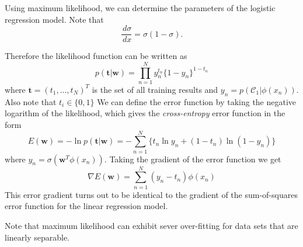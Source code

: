 \documentclass[11pt]{article}
\begin{document}
  Using maximum likelihood, we can determine the parameters of the logistic
  regression model. Note that
  \begin{equation*}
    \frac{\,d\sigma}{\,dx} = \sigma(1-\sigma).
  \end{equation*}

  Therefore the likelihood function can be written as
  \begin{equation*}
    p(\textbf{t}|\textbf{w}) = \prod_{n=1}^N y_n^{t_n} \{1-y_n\}^{1-t_n}
  \end{equation*}
  where $\textbf{t} = (t_1, ..., t_N)^T$ is the set of all training results and
  $y_n = p(\mathcal{C}_1|\phi(x_n))$. Also note that $t_i \in \{0, 1\}$
  We can define the error function by
  taking the negative logarithm of the likelihood, which gives the
  \textit{cross-entropy} error function in the form
  \begin{equation*}
    E(\textbf{w}) = -\ln p(\textbf{t}|\textbf{w})
    = - \sum_{n=1}^N \{t_n\ln y_n + (1-t_n)\ln(1-y_n)\}
  \end{equation*}
  where $y_n=\sigma(\textbf{w}^T\phi(x_n))$. Taking the gradient of the error
  function we get
  \begin{equation*}
    \nabla E(\textbf{w}) = \sum_{n=1}^N (y_n - t_n) \phi(x_n)
  \end{equation*}
  This error gradient turns out to be identical to the gradient of the
  sum-of-squares error function for the linear regression model.

  Note that maximum likelihood can exhibit sever over-fitting for data sets
  that are linearly separable.
\end{document}
